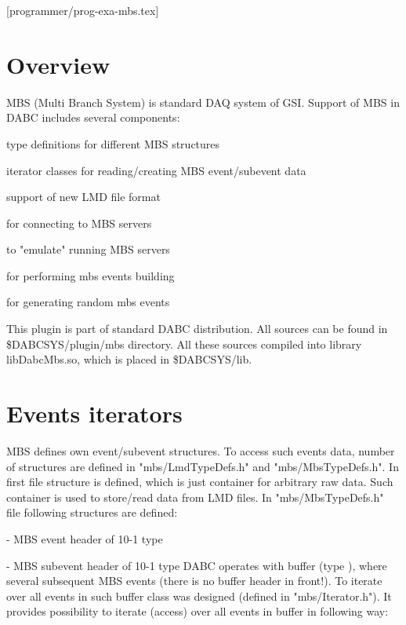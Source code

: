 [programmer/prog-exa-mbs.tex]

\section{Overview}

MBS (Multi Branch System) is standard DAQ system of GSI.
Support of MBS in DABC includes several components:
\bbul
\item type definitions for different MBS structures  
\item iterator classes for reading/creating MBS event/subevent data 
\item support of new LMD file format  
\item {} for connecting to MBS servers  
\item {} to "emulate" running MBS servers  
\item {} for performing mbs events building   
\item {} for generating random mbs events 
\ebul

This plugin is part of standard DABC distribution.  
All sources can be found in \$DABCSYS/plugin/mbs directory.
All these sources compiled into library libDabcMbs.so, which is placed in \$DABCSYS/lib. 

\section{Events iterators}

MBS defines own event/subevent structures. To access such events data,
number of structures are defined in "mbs/LmdTypeDefs.h" and "mbs/MbsTypeDefs.h".
In first file structure  is defined, which is just container for 
arbitrary raw data. Such container is used to store/read data from LMD files.
In "mbs/MbsTypeDefs.h" file following structures are defined:
\bbul
\item {} - MBS event header of 10-1 type 
\item {} - MBS subevent header of 10-1 type 
\ebul
DABC operates with buffer (type ), where several subsequent 
MBS events (there is no buffer header in front!). To iterate over all events in such
buffer class  was designed (defined in "mbs/Iterator.h"). It provides
possibility to iterate (access) over all events in buffer in following way:

